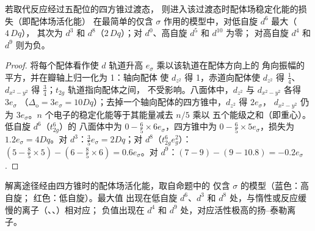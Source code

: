 \begin{proposition}[配体场活化能]\label{prop:b3:complex-mechanisms:lfae}
若取代反应经过五配位的四方锥过渡态，
则进入该过渡态时配体场稳定化能的损失（即配体场活化能）
在最简单的仅含 $\sigma$ 作用的模型中，对低自旋 $d^6$ 最大（$4\,Dq$），
其次为 $d^3$ 和 $d^8$（$2\,Dq$）；对 $d^0$、高自旋 $d^5$ 和 $d^{10}$ 为零；
对高自旋 $d^4$ 和 $d^9$ 则为负。
\end{proposition}

\begin{proof}
将每个配体看作使 $d$ 轨道升高 $e_\sigma$ 乘以该轨道在配体方向上的
角向振幅的平方，并在瓣轴上归一化为 1：轴向配体
使 $d_{z^2}$ 得 1，赤道向配体使 $d_{z^2}$ 得 $\frac14$、$d_{x^2-y^2}$ 得 $\frac34$；$t_{2g}$ 轨道指向配体之间，
不受影响。八面体中，$d_{z^2}$ 与 $d_{x^2-y^2}$ 各得 $3e_\sigma$
（$\Delta_{\mathrm o} = 3e_\sigma = 10Dq$）；去掉一个轴向配体的四方锥中，$d_{z^2}$ 得 $2e_\sigma$，
$d_{x^2-y^2}$ 仍为 $3e_\sigma$。$n$ 个电子的稳定化能等于其能量减去 $n/5$ 乘以
五个能级之和（即重心）。低自旋 $d^6$（$t_{2g}^6$）的
八面体中为 $0 - \frac65 \times 6e_\sigma$，四方锥中为 $0 - \frac65 \times 5e_\sigma$，损失为 $1.2e_\sigma = 4Dq$。对 $d^3$：$\frac35e_\sigma =
2Dq$；对 $d^8$（$t_{2g}^6e_g^2$）：$(5 - \frac85 \times 5) - (6 - \frac85 \times 6) = 0.6e_\sigma$。对 $d^9$：$(7 - 9) - (9 -
10.8) = -0.2e_\sigma$.
\end{proof}

\begin{omfigure}

{\small 解离途径经由四方锥时的配体场活化能，取自命题中的
仅含 $\sigma$ 的模型（蓝色：高自旋；
红色：低自旋）。最大值
出现在低自旋 $d^6$、$d^3$ 和 $d^8$ 处，与惰性或反应缓慢的离子（、、）相对应；
负值出现在 $d^4$ 和 $d^9$ 处，对应活性极高的扬–泰勒离子。}
\end{omfigure}

